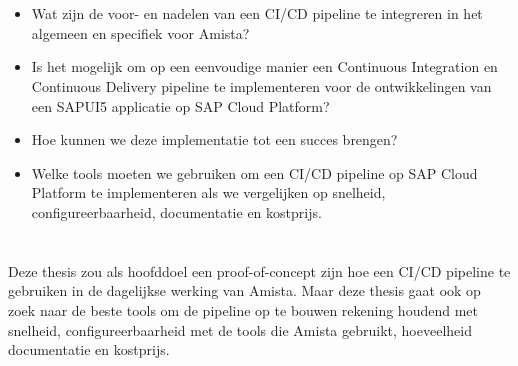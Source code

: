 \section{}
\label{sec:onderzoeksvraag}

\begin{itemize}
    \item Wat zijn de voor- en nadelen van een CI/CD pipeline te integreren in het algemeen en specifiek voor Amista?
    \item Is het mogelijk om op een eenvoudige manier een Continuous Integration en Continuous Delivery pipeline te implementeren voor de ontwikkelingen van een SAPUI5 applicatie op SAP Cloud Platform?
    \item Hoe kunnen we deze implementatie tot een succes brengen?
    \item Welke tools moeten we gebruiken om een CI/CD pipeline op SAP Cloud Platform te implementeren als we vergelijken op snelheid, configureerbaarheid, documentatie en kostprijs.
\end{itemize}

\section{}
\label{sec:onderzoeksdoelstelling}

Deze thesis zou als hoofddoel een proof-of-concept zijn hoe een CI/CD pipeline te gebruiken in de dagelijkse werking van Amista. 
Maar deze thesis gaat ook op zoek naar de beste tools om de pipeline op te bouwen rekening houdend met snelheid, configureerbaarheid met de tools die Amista gebruikt, hoeveelheid documentatie en kostprijs.

\section{}
\label{sec:opzet-bachelorproef}

